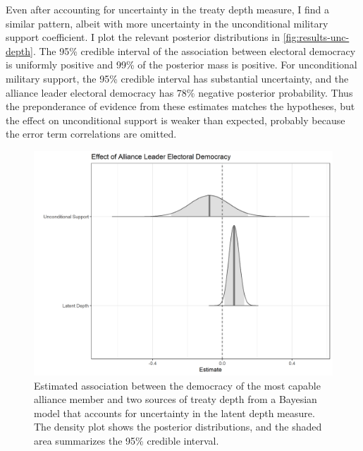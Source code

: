 \documentclass[12pt]{article}
\begin{document}
Even after accounting for uncertainty in the treaty depth measure, I find a similar pattern, albeit with more uncertainty in the unconditional military support coefficient. 
I plot the relevant posterior distributions in \autoref{fig:results-unc-depth}. 
The 95\% credible interval of the association between electoral democracy is uniformly positive and 99\% of the posterior mass is positive. 
For unconditional military support, the 95\% credible interval has substantial uncertainty, and the alliance leader electoral democracy has 78\% negative posterior probability. 
Thus the preponderance of evidence from these estimates matches the hypotheses, but the effect on unconditional support is weaker than expected, probably because the error term correlations are omitted. 


\begin{figure}
\includegraphics[width=.95\textwidth]{results-unc-depth.png}  
\caption{Estimated association between the democracy of the most capable alliance member and two sources of treaty depth from a Bayesian model that accounts for uncertainty in the latent depth measure. The density plot shows the posterior distributions, and the shaded area summarizes the 95\% credible interval.}
\label{fig:results-unc-depth}
\end{figure}




\newpage

\singlespace
 
 
\end{document}
